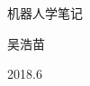 \thispagestyle{empty} %
\BgThispage
\begin{titlepage}
\centering
\begin{center}
	\vspace*{6cm}
	{\par \Huge {\heiti 机器人学笔记 } }
	\vspace{1cm}
	{\par \LARGE {\lishu  吴浩苗} }
	\vspace{12cm}
    {\par \large 2018.6}
\end{center}

\end{titlepage}
